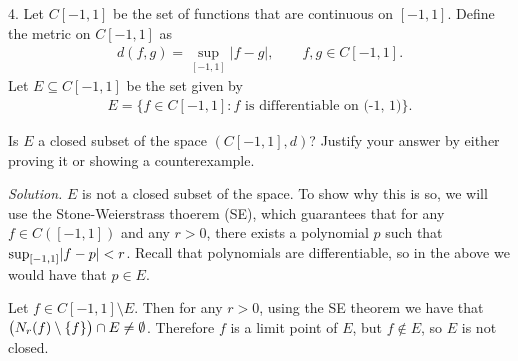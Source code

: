 \documentclass{article}
\begin{document}
\newpage

4. Let $C[-1, 1]$ be the set of functions that are continuous on $[-1,
   1]$. Define the metric on $C[-1, 1]$ as
%
\begin{align*}
    d(f, g) =  \sup_{[-1, 1]} |f - g|,
    \qquad
    f, g \in C[-1, 1].
\end{align*}
%
Let $E \subseteq C[-1, 1]$ be the set given by
%
\begin{align*}
   E = \{f \in C[-1, 1] : \text{$f$ is differentiable on (-1, 1)}\}.
\end{align*}

Is $E$ a closed subset of the space $(C[-1, 1], d)$? Justify your answer
by either proving it or showing a counterexample.

\textit{Solution.}
$E$ is not a closed subset of the space. To show why this is so, we will
use the Stone-Weierstrass thoerem (SE), which guarantees that for any $f
\in C([-1, 1])$ and any $r > 0$, there exists a polynomial $p$ such that
$\sup_{[-1, 1]} \envert{f - p} < r$. Recall that polynomials are
differentiable, so in the above we would have that $p \in E$.

Let $f \in C[-1, 1] \setminus E$. Then for any $r > 0$, using the SE
theorem we have that $\del{N_r(f) \setminus \cbr{f}} \cap E \neq
\emptyset$. Therefore $f$ is a limit point of $E$, but $f \not\in E$, so
$E$ is not closed.
\end{document}
